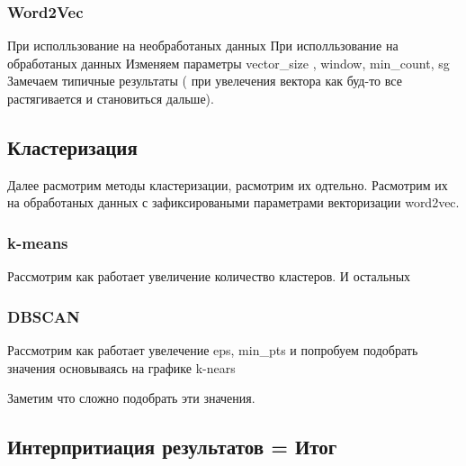 		\subsubsection{Word2Vec}
		 	При исполльзование на необработаных данных
		 	При исполльзование на обработаных данных
		 	Изменяем параметры vector\_size , window, min\_count, sg
		 	Замечаем типичные результаты ( при увелечения вектора как буд-то все растягивается и становиться дальше). 
	
	
	\subsection{Кластеризация}
		Далее расмотрим методы кластеризации, расмотрим их одтельно. Расмотрим их на обработаных данных с зафиксироваными параметрами векторизации word2vec. 
		
		\subsubsection{k-means}
			Рассмотрим как работает увеличение количество кластеров. И остальных
		
		\subsubsection{DBSCAN}
			Рассмотрим как работает увелечение eps, min\_pts и попробуем подобрать значения основываясь на графике k-nears
			
			Заметим что сложно подобрать эти значения.
	
	\subsection{Интерпритиация результатов = Итог}
		
		
		

